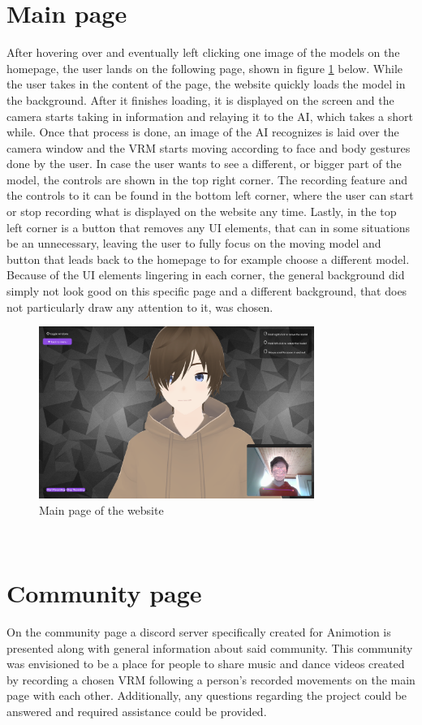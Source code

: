 \section{Main page}
After hovering over and eventually left clicking one image of the models on the homepage,
the user lands on the following page, shown in figure \ref{fig:mainpage} below. While the user takes in
the content of the page, the website quickly loads the model in the background. After it
finishes loading, it is displayed on the screen and the camera starts taking in information
and relaying it to the AI, which takes a short while. Once that process is done, an image
of the AI recognizes is laid over the camera window and the VRM starts moving according
to face and body gestures done by the user. In case the user wants to see a different, or
bigger part of the model, the controls are shown in the top right corner. The recording
feature and the controls to it can be found in the bottom left corner, where the user can
start or stop recording what is displayed on the website any time. Lastly, in the top left
corner is a button that removes any UI elements, that can in some situations be an unnecessary,
leaving the user to fully focus on the moving model and button that leads back to the homepage
to for example choose a different model. Because of the UI elements lingering in each corner,
the general background did simply not look good on this specific page and a different background,
that does not particularly draw any attention to it, was chosen.
\\
\begin{figure}[htb]
    \centering
    \includegraphics[width=0.8\textwidth]{pics/Animotion_mainpage.png}
    \caption{Main page of the website}
    \label{fig:mainpage}
\end{figure}
\\
\section{Community page}
On the community page a discord server specifically created for Animotion is presented along with
general information about said community. This community was envisioned to be a place for people
to share music and dance videos created by recording a chosen VRM following a person's recorded
movements on the main page with each other. Additionally, any questions regarding the project could
be answered and required assistance could be provided.

